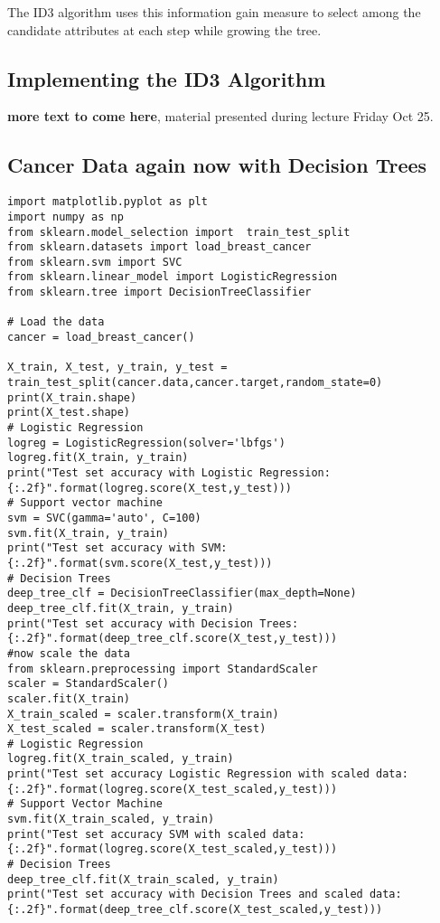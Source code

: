 \documentclass[%
oneside,                 %
final,                   %
10pt]{article}
\begin{document}
The ID3 algorithm uses this information gain measure to select among the candidate
attributes at each step while growing the tree.

\subsection*{Implementing the ID3 Algorithm}

\textbf{more text to come here}, material presented during lecture Friday Oct 25.

\subsection*{Cancer Data again now with Decision Trees}
\begin{verbatim}
import matplotlib.pyplot as plt
import numpy as np
from sklearn.model_selection import  train_test_split 
from sklearn.datasets import load_breast_cancer
from sklearn.svm import SVC
from sklearn.linear_model import LogisticRegression
from sklearn.tree import DecisionTreeClassifier

# Load the data
cancer = load_breast_cancer()

X_train, X_test, y_train, y_test = train_test_split(cancer.data,cancer.target,random_state=0)
print(X_train.shape)
print(X_test.shape)
# Logistic Regression
logreg = LogisticRegression(solver='lbfgs')
logreg.fit(X_train, y_train)
print("Test set accuracy with Logistic Regression: {:.2f}".format(logreg.score(X_test,y_test)))
# Support vector machine
svm = SVC(gamma='auto', C=100)
svm.fit(X_train, y_train)
print("Test set accuracy with SVM: {:.2f}".format(svm.score(X_test,y_test)))
# Decision Trees
deep_tree_clf = DecisionTreeClassifier(max_depth=None)
deep_tree_clf.fit(X_train, y_train)
print("Test set accuracy with Decision Trees: {:.2f}".format(deep_tree_clf.score(X_test,y_test)))
#now scale the data
from sklearn.preprocessing import StandardScaler
scaler = StandardScaler()
scaler.fit(X_train)
X_train_scaled = scaler.transform(X_train)
X_test_scaled = scaler.transform(X_test)
# Logistic Regression
logreg.fit(X_train_scaled, y_train)
print("Test set accuracy Logistic Regression with scaled data: {:.2f}".format(logreg.score(X_test_scaled,y_test)))
# Support Vector Machine
svm.fit(X_train_scaled, y_train)
print("Test set accuracy SVM with scaled data: {:.2f}".format(logreg.score(X_test_scaled,y_test)))
# Decision Trees
deep_tree_clf.fit(X_train_scaled, y_train)
print("Test set accuracy with Decision Trees and scaled data: {:.2f}".format(deep_tree_clf.score(X_test_scaled,y_test)))

\end{verbatim}
\end{document}
